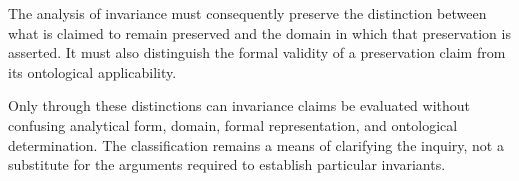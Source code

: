 The analysis of invariance must consequently
preserve the distinction between what
is claimed to remain preserved and the
domain in which that preservation is
asserted. It must also distinguish the
formal validity of a preservation claim
from its ontological applicability.

Only through these distinctions can
invariance claims be evaluated without
confusing analytical form, domain,
formal representation, and ontological
determination. The classification
remains a means of clarifying the inquiry,
not a substitute for the arguments
required to establish particular
invariants.

